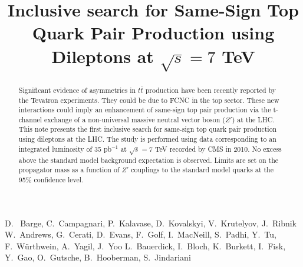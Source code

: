 \documentclass{cmspaper}
\begin{document}
%
\begin{titlepage}
\title{Inclusive search for Same-Sign Top Quark Pair Production using Dileptons at $\sqrt{s} = 7 $ TeV}

  \begin{Authlist}
    D.~ Barge, C.~Campagnari, P.~Kalavase, D.~Kovalskyi, V.~Krutelyov, J.~Ribnik
    W.~Andrews, G.~Cerati, D.~Evans, F.~Golf, I.~MacNeill, S.~Padhi, Y.~Tu, F.~W\"urthwein, A.~Yagil, J.~Yoo
    L.~Bauerdick, I.~Bloch, K.~Burkett, I.~Fisk, Y.~Gao, O.~Gutsche, B.~Hooberman, S.~Jindariani
  \end{Authlist}

\begin{abstract}
Significant evidence of asymmetries in $t\bar{t}$ production have been recently 
reported by the Tevatron experiments.   They could be due to FCNC in the top
sector.  These new interactions
could imply an enhancement of  same-sign top pair production via 
the t-channel exchange of a non-universal 
massive neutral vector boson ($Z'$) at the LHC. 
This note presents the first inclusive search for same-sign top quark 
pair production using dileptons at the LHC. 
The study is performed using data corresponding to an integrated luminosity 
of 35 pb$^{-1}$ at $\sqrt{s} = 7 $ TeV recorded  by CMS in 2010. 
No excess above the standard model background expectation is observed. 
Limits are set on the propagator mass as a function of $Z'$ couplings to 
the standard model quarks at the 95\% confidence level. 
\end{abstract}
\end{titlepage}





\clearpage

\end{document}
